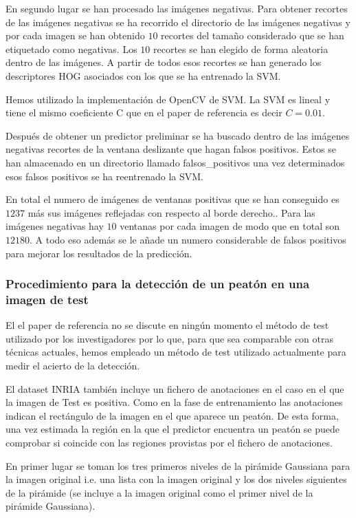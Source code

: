 \documentclass[a4paper,12pt]{article}
\begin{document}
En segundo lugar se han procesado las imágenes negativas. Para
obtener recortes de las imágenes negativas se ha recorrido el
directorio de las imágenes negativas y por cada imagen se han
obtenido $10$ recortes del tamaño considerado que se han etiquetado
como negativas. Los $10$ recortes se han elegido de forma aleatoria
dentro de las imágenes. A partir de todos esos recortes se han generado
los descriptores HOG asociados con los que se ha entrenado la SVM.

Hemos utilizado la implementación de OpenCV de SVM. La SVM es
lineal y tiene el mismo coeficiente C que en el paper de referencia
es decir $C = 0.01$.

Después de obtener un predictor preliminar se ha buscado dentro de las
imágenes negativas recortes de la ventana deslizante que hagan falsos
positivos. Estos se han almacenado en un directorio llamado falsos\_positivos
una vez determinados esos falsos positivos se ha reentrenado la SVM.

En total el numero de imágenes de ventanas positivas que se han
conseguido es $1237$ más sus imágenes reflejadas con respecto al borde derecho.. Para las imágenes negativas hay $10$ ventanas por
cada imagen de modo que en total son $12180$. A todo eso además se le añade
un numero considerable de falsos positivos para mejorar los resultados
de la predicción.

\subsubsection{Procedimiento para la detección de un peatón en una imagen de test}

El el paper de referencia no se discute en ningún momento el método de test utilizado por los investigadores por lo que, para que sea comparable con otras técnicas actuales, hemos empleado un método de test utilizado actualmente para medir el acierto de la detección.



El dataset INRIA también incluye un fichero de anotaciones en el caso en el que la imagen de Test es positiva. Como en la fase de entrenamiento las anotaciones indican el rectángulo de la imagen en el que aparece un peatón. De esta forma, una vez estimada la región en la que el predictor encuentra un peatón se puede comprobar si coincide con las regiones provistas por el fichero de anotaciones. 

En primer lugar se toman los tres primeros niveles de la pirámide Gaussiana para la imagen original i.e. una lista con la imagen original y los dos niveles siguientes de la pirámide (se incluye a la imagen original como el primer nivel de la pirámide Gaussiana).
\end{document}
